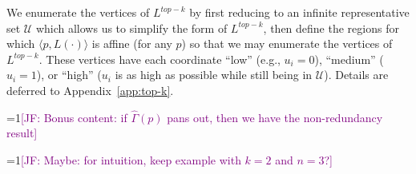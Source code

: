 \documentclass[12pt]{article}
\newcommand{\Comments}{1}
\newcommand{\mynote}[2]{\ifnum\Comments=1\textcolor{#1}{#2}\fi}
\newcommand{\jessie}[1]{\mynote{purple}{[JF: #1]}}
\newcommand{\U}{\mathcal{U}}
\newcommand{\inprod}[2]{\langle #1, #2 \rangle}%
\begin{document}
We enumerate the vertices of $L^{top-k}$ by first reducing to an infinite representative set $\U$ which allows us to simplify the form of $L^{top-k}$, then define the regions for which $\inprod{p}{L(\cdot)}$ is affine (for any $p$) so that we may enumerate the vertices of $L^{top-k}$.
These vertices have each coordinate ``low'' (e.g., $u_i = 0$), ``medium'' ($u_i = 1$), or ``high'' ($u_i$ is as high as possible while still being in $\U$).
Details are deferred to Appendix~\ref{app:top-k}.

\jessie{Bonus content: if $\hat \Gamma(p)$ pans out, then we have the non-redundancy result} 

\jessie{Maybe: for intuition, keep example with $k = 2$ and $n = 3$?}
\end{document}
